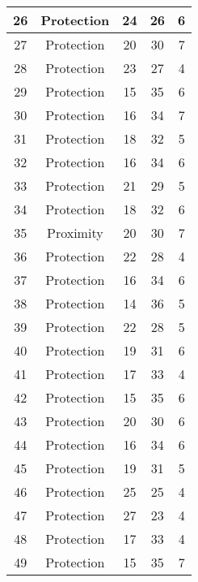 \documentclass[results.tex]{subfiles}
\begin{document}
\begin{center}
\begin{tabular}{| c || c | c | c | c |}
    \hline
    26 & Protection & 24 & 26 & 6 \\ 
    \hline
    27 & Protection & 20 & 30 & 7 \\ 
    \hline
    28 & Protection & 23 & 27 & 4 \\ 
    \hline
    29 & Protection & 15 & 35 & 6 \\ 
    \hline
    30 & Protection & 16 & 34 & 7 \\ 
    \hline
    31 & Protection & 18 & 32 & 5 \\ 
    \hline
    32 & Protection & 16 & 34 & 6 \\ 
    \hline
    33 & Protection & 21 & 29 & 5 \\ 
    \hline
    34 & Protection & 18 & 32 & 6 \\ 
    \hline
    35 & Proximity & 20 & 30 & 7 \\ 
    \hline
    36 & Protection & 22 & 28 & 4 \\ 
    \hline
    37 & Protection & 16 & 34 & 6 \\ 
    \hline
    38 & Protection & 14 & 36 & 5 \\ 
    \hline
    39 & Protection & 22 & 28 & 5 \\ 
    \hline
    40 & Protection & 19 & 31 & 6 \\ 
    \hline
    41 & Protection & 17 & 33 & 4 \\ 
    \hline
    42 & Protection & 15 & 35 & 6 \\ 
    \hline
    43 & Protection & 20 & 30 & 6 \\ 
    \hline
    44 & Protection & 16 & 34 & 6 \\ 
    \hline
    45 & Protection & 19 & 31 & 5 \\ 
    \hline
    46 & Protection & 25 & 25 & 4 \\ 
    \hline
    47 & Protection & 27 & 23 & 4 \\ 
    \hline
    48 & Protection & 17 & 33 & 4 \\ 
    \hline
    49 & Protection & 15 & 35 & 7 \\ 
    \hline   \end{tabular}
\end{center}
\end{document}
